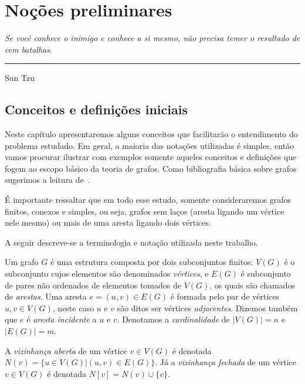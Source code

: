 \chapter{Noções preliminares}\label{Notions}


\begin{flushright}
\begin{minipage}[t][0cm][b]{0.47\textwidth}
\emph{Se você conhece o inimigo e conhece a si mesmo, não precisa temer o resultado de cem batalhas. }
\end{minipage}

\rule[0cm]{7cm}{0.03cm}%

Sun Tzu
\end{flushright}

\section{Conceitos e definições iniciais}

Neste capítulo apresentaremos alguns conceitos que facilitarão o entendimento do problema estudado. Em geral, a maioria das notações utilizadas é simples, então vamos procurar ilustrar com exemplos somente aqueles conceitos e definições que fogem ao escopo básico da teoria de grafos. Como bibliografia básica sobre grafos sugerimos a leitura de~\cite{jayme2018}.

É importante ressaltar que em todo esse estudo, somente consideraremos grafos finitos, conexos e simples, ou seja, grafos sem
laços (aresta ligando um vértice nele mesmo) ou mais de uma aresta ligando dois
vértices.

A seguir descreve-se a terminologia e notação utilizada neste trabalho.

Um grafo $G$ é uma estrutura composta por dois subconjuntos finitos: $V(G)$ é o subconjunto cujos elementos são denominados \emph{vértices}, e $E(G)$ é subconjunto de pares não ordenados de elementos tomados de $V(G)$, os quais são chamados de \emph{arestas}. Uma aresta $e = (u,v)\in E(G)$ é formada pelo par de vértices $u,v \in V(G)$, neste caso $u$ e $v$ são ditos ser vértices \emph{adjacentes}. Dizemos também que  $e$ é \emph{aresta incidente} a $u$ e $v$. Denotamos a \emph{cardinalidade} de $|V(G)| = n$ e $|E(G)| = m$.

A \emph{vizinhança aberta} de um vértice $v\in V(G)$ é denotada $N(v) = \{u\in V(G) | (u,v) \in E(G)\}$. Já a \emph{vizinhança fechada} de um vértice $v\in V(G)$ é denotada $N[v] = N(v) \cup \{v\}$. 

